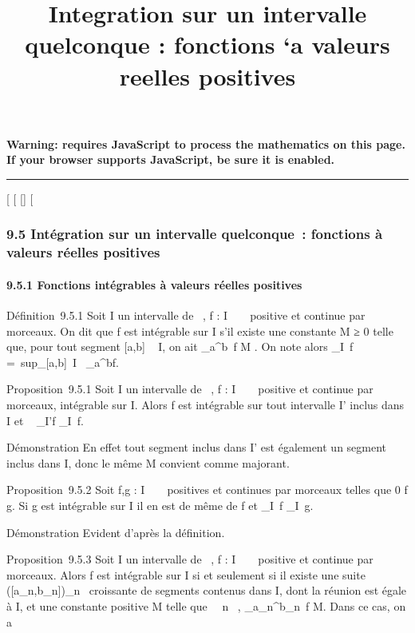 \documentclass[]{article}
\title{Integration sur un intervalle quelconque : fonctions `a valeurs reelles
positives}
\author{}
\date{}
\begin{document}
\maketitle

\textbf{Warning: 
requires JavaScript to process the mathematics on this page.\\ If your
browser supports JavaScript, be sure it is enabled.}

\begin{center}\rule{3in}{0.4pt}\end{center}

[
[
[]
[

\subsubsection{9.5 Intégration sur un intervalle quelconque~: fonctions
à valeurs réelles positives}

\paragraph{9.5.1 Fonctions intégrables à valeurs réelles positives}

Définition~9.5.1 Soit I un intervalle de ~, f : I \rightarrow~ ~ positive et
continue par morceaux. On dit que f est intégrable sur I s'il existe une
constante M ≥ 0 telle que, pour tout segment [a,b] \subset~ I, on ait
\int  _a^b~f \leq M . On note alors
\int  _I~f =\
sup_[a,b]\subset~I\int ~
_a^bf.

Proposition~9.5.1 Soit I un intervalle de ~, f : I \rightarrow~ ~ positive et
continue par morceaux, intégrable sur I. Alors f est intégrable sur tout
intervalle I' inclus dans I et \int ~
_I'f \leq\int  _I~f.

Démonstration En effet tout segment inclus dans I' est également un
segment inclus dans I, donc le même M convient comme majorant.

Proposition~9.5.2 Soit f,g : I \rightarrow~ ~ positives et continues par morceaux
telles que 0 \leq f \leq g. Si g est intégrable sur I il en est de même de f
et \int  _I~f
\leq\int  _I~g.

Démonstration Evident d'après la définition.

Proposition~9.5.3 Soit I un intervalle de ~, f : I \rightarrow~ ~ positive et
continue par morceaux. Alors f est intégrable sur I si et seulement si
il existe une suite ([a_n,b_n])_n\in\mathbb{N}~
croissante de segments contenus dans I, dont la réunion est égale à I,
et une constante positive M telle que \forall~~n \in \mathbb{N}~,
\int  _a_n^b_n~f
\leq M. Dans ce cas, on a
\end{document}
